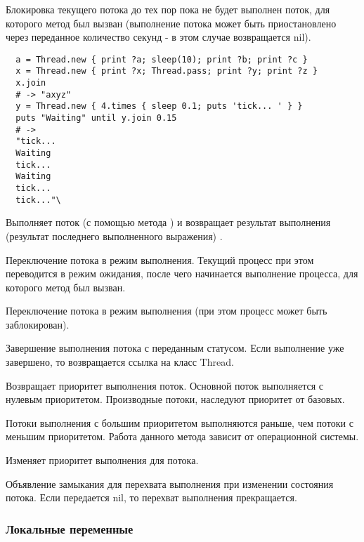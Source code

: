 \begin{methodlist}
  Блокировка текущего потока до тех пор пока не будет выполнен поток, для которого метод был вызван (выполнение потока может быть приостановлено через переданное количество секунд - в этом случае возвращается nil).
  \begin{verbatim}
  a = Thread.new { print ?a; sleep(10); print ?b; print ?c } 
  x = Thread.new { print ?x; Thread.pass; print ?y; print ?z } 
  x.join 
  # -> "axyz" 
  y = Thread.new { 4.times { sleep 0.1; puts 'tick... ' } } 
  puts "Waiting" until y.join 0.15 
  # -> 
  "tick... 
  Waiting 
  tick... 
  Waiting 
  tick... 
  tick..."\
  \end{verbatim}

  Выполняет поток (с помощью метода ) и возвращает результат выполнения (результат последнего выполненного выражения) .

  Переключение потока в режим выполнения. Текущий процесс при этом переводится в режим ожидания, после чего начинается выполнение процесса, для которого метод был вызван. 

  Переключение потока в режим выполнения (при этом процесс может быть заблокирован).

  Завершение выполнения потока с переданным статусом. Если выполнение уже завершено, то возвращается ссылка на класс Thread. 
 
  Возвращает приоритет выполнения поток. Основной поток выполняется с нулевым приоритетом. Производные потоки, наследуют приоритет от базовых. 

  Потоки выполнения с большим приоритетом выполняются раньше, чем потоки с меньшим приоритетом. Работа данного метода зависит от операционной системы. 

  Изменяет приоритет выполнения для потока.

  Объявление замыкания для перехвата выполнения при изменении состояния потока. Если передается nil, то перехват выполнения прекращается.
\end{methodlist}

\subsubsection*{Локальные переменные}

